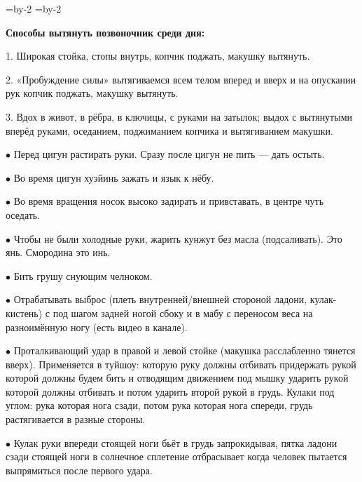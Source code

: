 \pdfhorigin=15mm \hsize=\pdfpagewidth \advance\hsize by-2\pdfhorigin
\pdfvorigin=15mm \vsize=\pdfpageheight \advance\vsize by-2\pdfvorigin

{\bf Способы вытянуть позвоночник среди дня:}

\item{1.} Широкая стойка, стопы внутрь, копчик поджать, макушку вытянуть.

\item{2.} «Пробуждение силы» вытягиваемся всем телом вперед и вверх и на опускании
рук копчик поджать, макушку вытянуть.

\item{3.} Вдох в живот, в рёбра, в ключицы, с руками на затылок;
выдох с вытянутыми вперёд руками, оседанием, поджиманием копчика и
вытягиванием макушки.

\bigskip

\item{$\bullet$} Перед цигун растирать руки. Сразу после цигун не пить --- дать остыть.

\item{$\bullet$} Во время цигун хуэйинь зажать и язык к нёбу.

\item{$\bullet$} Во время вращения носок высоко задирать и привставать, в центре чуть оседать.

\item{$\bullet$} Чтобы не были холодные руки, жарить кунжут без масла (подсаливать).
Это янь. Смородина это инь.

\item{$\bullet$} Бить грушу снующим челноком.

\item{$\bullet$} Отрабатывать выброс (плеть внутренней/внешней стороной ладони, кулак-кистень) с под шагом задней ногой сбоку и в мабу с переносом веса на разноимённую ногу (есть видео в канале).

\item{$\bullet$} Проталкивающий удар в правой и левой стойке (макушка расслабленно тянется вверх).
Применяется в туйшоу: которую руку должны отбивать придержать рукой которой должны будем бить и отводящим движением под мышку ударить рукой которой должны отбивать и потом ударить второй рукой в грудь. Кулаки под углом: рука которая нога сзади, потом рука которая нога спереди, грудь растягивается в разные стороны.

\item{$\bullet$} Кулак руки впереди стоящей ноги бьёт в грудь запрокидывая, пятка ладони сзади стоящей ноги в солнечное сплетение отбрасывает когда человек пытается выпрямиться после первого удара.

